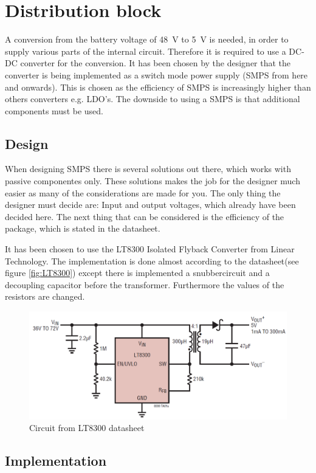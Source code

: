 \newpage
\section{Distribution block}
\label{sec:SMPS}
A conversion from the battery voltage of \SI{48}{\volt} to \SI{5}{\volt} is needed, in order to supply various parts of the internal circuit. Therefore it is required to use a DC-DC converter for the conversion. It has been chosen by the designer that the converter is being implemented as a switch mode power supply (SMPS from here and onwards). This is chosen as the efficiency of SMPS is increasingly higher than others converters e.g. LDO's. The downside to using a SMPS is that additional components must be used.  

\subsection{Design}
When designing SMPS there is several solutions out there, which works with passive componentes only. These solutions makes the job for the designer much easier as many of the considerations are made for you. The only thing the designer must decide are: Input and output voltages, which already have been decided here. The next thing that can be considered is the efficiency of the package, which is stated in the datasheet.

It has been chosen to use the LT8300 Isolated Flyback Converter from Linear Technology. The implementation is done almost according to the datasheet(see figure \vref{fig:LT8300}) \cite{LT8300} except there is implemented a snubbercircuit and a decoupling capacitor before the transformer. Furthermore the values of the resistors are changed.  \\

\begin{figure}[H]
	\centering
	\includegraphics[width=0.6\linewidth]{Hardware/Pictures/LT8300_circuit}
	\caption{Circuit from LT8300 datasheet}
	\label{fig:LT8300}
\end{figure}

\subsection{Implementation}

